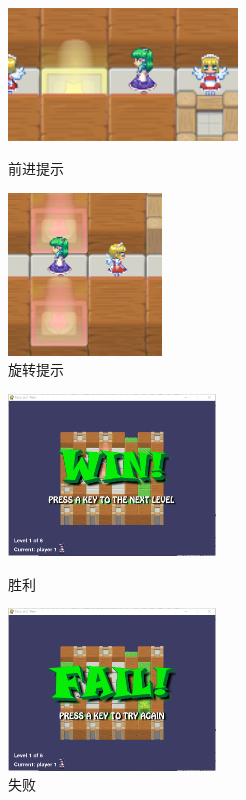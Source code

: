 \begin{figure}[htbp]
\begin{minipage}[t]{0.5\linewidth}
\centering
\includegraphics[width=2.4in]{pic/stephint.png}
\caption{前进提示}
\label{fig:stephint}
\end{minipage}
\begin{minipage}[t]{0.5\linewidth}
\centering
\includegraphics[width=1.6in]{pic/turnhint.png}
\caption{旋转提示}
\label{fig:turnhint}
\end{minipage}
\end{figure}

\begin{figure}[htbp]
\begin{minipage}[t]{0.5\linewidth}
	\centering
	\includegraphics[width=5.5cm]{pic/win.png}
	\caption{胜利}
	\label{fig:win}
\end{minipage}
\begin{minipage}[t]{0.5\linewidth}
	\centering
	\includegraphics[width=5.5cm]{pic/fail.png}
	\caption{失败}
	\label{fig:fail}
\end{minipage}
\end{figure}

